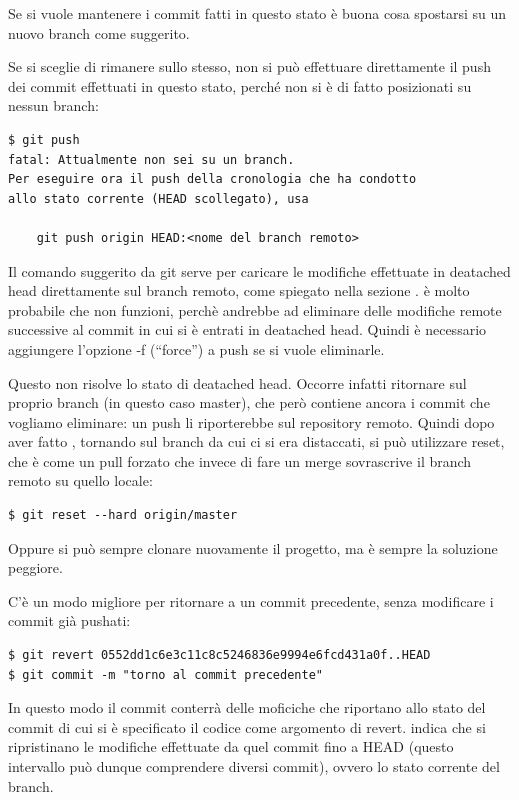 \documentclass{article}
\begin{document}
Se si vuole mantenere i commit fatti in questo stato è buona cosa spostarsi su
un nuovo branch come suggerito.

Se si sceglie di rimanere sullo stesso, non si può effettuare direttamente il push dei
commit effettuati in questo stato, perché non si è di fatto posizionati su nessun branch:

\begin{verbatim}
$ git push
fatal: Attualmente non sei su un branch.
Per eseguire ora il push della cronologia che ha condotto
allo stato corrente (HEAD scollegato), usa

    git push origin HEAD:<nome del branch remoto>
\end{verbatim}

Il comando suggerito da git serve per caricare le modifiche effettuate in deatached head
direttamente sul branch remoto, come spiegato nella sezione .
è molto probabile che non funzioni, perchè andrebbe ad
eliminare delle modifiche remote successive al commit in
cui si è entrati in deatached head. Quindi è necessario aggiungere l'opzione -f
(``force'') a push se si vuole eliminarle.

Questo non risolve lo stato di deatached head.
Occorre infatti ritornare sul proprio branch (in questo caso master),
che però contiene ancora i commit che vogliamo eliminare: un push li riporterebbe sul 
repository remoto.
Quindi dopo aver fatto , tornando sul branch da cui ci
si era distaccati, si può utilizzare reset, che è come un pull forzato che invece
di fare un merge sovrascrive il branch remoto su quello locale:

\begin{verbatim}
$ git reset --hard origin/master
\end{verbatim}

Oppure si può sempre clonare nuovamente il progetto, ma è sempre la soluzione
peggiore.

C'è un modo migliore per ritornare a un commit precedente, senza modificare i
commit già pushati:

\begin{verbatim}
$ git revert 0552dd1c6e3c11c8c5246836e9994e6fcd431a0f..HEAD
$ git commit -m "torno al commit precedente"
\end{verbatim}

In questo modo il commit  conterrà delle
moficiche che riportano allo stato del commit di cui si è specificato il codice
come argomento di revert.  indica che si ripristinano le modifiche
effettuate da quel commit fino a HEAD (questo intervallo può dunque comprendere
diversi commit), ovvero lo stato corrente del branch.
\end{document}
